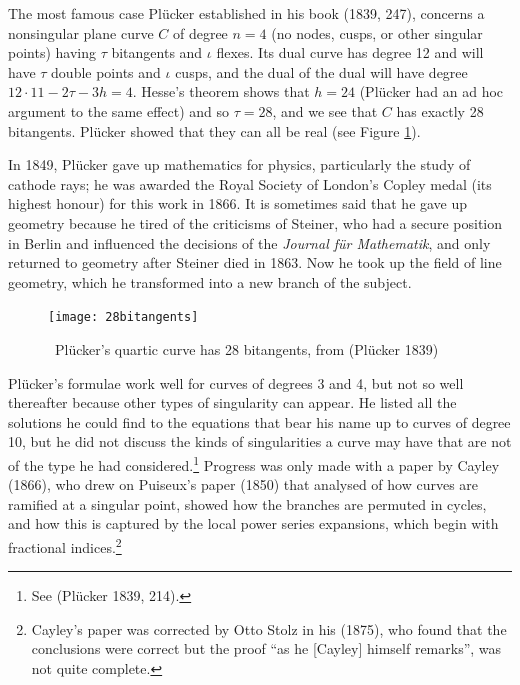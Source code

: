 The most famous case Pl\"ucker established in  his book (1839, 247),  concerns   a nonsingular plane curve $C$ of degree $n=4$  (no nodes, cusps, or other singular points) having $\tau$ bitangents and $\iota$ flexes.   Its dual curve has degree 12 and will have $\tau$ double points and $\iota$ cusps, and the dual of the dual will have degree 
$12\cdot 11 - 2\tau - 3h  = 4.$ 
Hesse's theorem shows that $h = 24$ (Pl\"ucker  had an ad hoc argument to the same effect)  and so $\tau = 28$,  and we  see that $C$ has exactly 28 bitangents. Pl\"ucker showed that they can all be real (see Figure \ref{fig28bitangents}).

In 1849, Pl\"ucker gave up mathematics for physics, particularly the study of cathode rays; he was awarded the Royal Society of London's Copley medal (its highest honour) for this work in 1866. It is sometimes said that he gave up geometry because he tired of the criticisms of Steiner, who had a secure position in Berlin and influenced the decisions of the \emph{Journal f\"ur Mathematik}, and only returned to geometry after Steiner died in 1863. Now he took up  the field of line geometry, which he transformed into a new branch of the subject. 

\bigskip

\begin{center}
    \begin{figure}
   \begin{center}  \texttt{[image: 28bitangents]} 
   \end{center}
     \protect \caption{\, Pl\"ucker's quartic curve has 28 bitangents, from (Pl\"ucker 1839)}
      \label{fig28bitangents}
     \end{figure}
\end{center}
\bigskip

Pl\"ucker's formulae work well for curves of degrees 3 and 4,  but not so well thereafter because other types of singularity can appear.   He listed all the solutions he could find to the equations that bear his name up to curves of degree 10, but he did not discuss the kinds of singularities a curve may have that are not of the type he had considered.\footnote{See (Pl\"ucker 1839, 214).}  Progress was only made with a paper by Cayley (1866), who drew on Puiseux's paper (1850) that analysed  of how curves are ramified at a singular point,  showed how the branches are permuted in cycles, and how this is captured by the local power series expansions, which begin with fractional indices.\footnote{Cayley's paper was corrected by Otto Stolz in his (1875), who found that the conclusions were correct but the proof ``as he [Cayley] himself remarks'', was not quite complete.}

